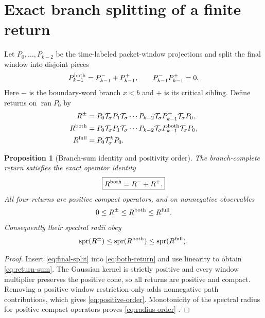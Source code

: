 \documentclass[11pt]{article}
\newtheorem{proposition}[theorem]{Proposition}
\theoremstyle{definition}
\theoremstyle{remark}
\newcommand{\cT}{\mathcal T}
\newcommand{\spr}{\operatorname{spr}}
\begin{document}
\section{Exact branch splitting of a finite return}
\label{sec:branch-return}

Let $P_0,\ldots,P_{k-2}$ be the time-labeled packet-window projections and
split the final window into disjoint pieces
\begin{equation}\label{eq:final-split}
 P_{k-1}^{\rm both}=P_{k-1}^-+P_{k-1}^+,
 \qquad P_{k-1}^-P_{k-1}^+=0.
\end{equation}
Here $-$ is the boundary-word branch $x<b$ and $+$ is its critical sibling.
Define returns on $\operatorname{ran}P_0$ by
\begin{align}
 R^\pm
 &=P_0\cT_\sigma P_1\cT_\sigma\cdots
 P_{k-2}\cT_\sigma P_{k-1}^\pm\cT_\sigma P_0,
 \label{eq:one-branch-return}\\
 R^{\rm both}
 &=P_0\cT_\sigma P_1\cT_\sigma\cdots
 P_{k-2}\cT_\sigma P_{k-1}^{\rm both}\cT_\sigma P_0,
 \label{eq:both-return}\\
 R^{\rm full}
 &=P_0\cT_\sigma^kP_0.
 \label{eq:full-endpoint-return}
\end{align}

\begin{proposition}[Branch-sum identity and positivity order]
\label{prop:branch-sum}
The branch-complete return satisfies the exact operator identity
\begin{equation}\label{eq:return-sum}
 \boxed{R^{\rm both}=R^-+R^+.}
\end{equation}
All four returns are positive compact operators, and on nonnegative
observables
\begin{equation}\label{eq:positive-order}
 0\le R^\pm\le R^{\rm both}\le R^{\rm full}.
\end{equation}
Consequently their spectral radii obey
\begin{equation}\label{eq:radius-order}
 \spr(R^\pm)\le\spr(R^{\rm both})\le\spr(R^{\rm full}).
\end{equation}
\end{proposition}

\begin{proof}
Insert \eqref{eq:final-split} into \eqref{eq:both-return} and use linearity
to obtain \eqref{eq:return-sum}.  The Gaussian kernel is strictly positive
and every window multiplier preserves the positive cone, so all returns are
positive and compact.  Removing a positive window restriction only adds
nonnegative path contributions, which gives \eqref{eq:positive-order}.
Monotonicity of the spectral radius for positive compact operators proves
\eqref{eq:radius-order} \citep{Baladi2000}.
\end{proof}
\end{document}
